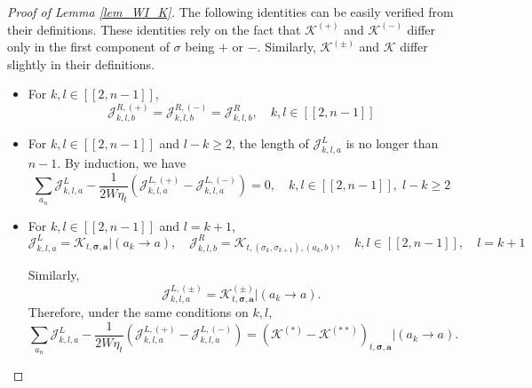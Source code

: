 \documentclass[10pt,a4paper]{amsart}
\newcommand{\cal}{\mathcal}
\begin{document}
\begin{proof}[Proof of Lemma \ref{lem_WI_K}]
The following  identities  can be easily verified from their definitions. These identities rely on the fact that ${\cal K}^{(+)}$ and ${\cal K}^{(-)}$ differ only in the first component of $\sigma$  being $+$ or  $-$. Similarly, ${\cal K}^{(\pm)}$ and ${\cal K}$ differ slightly in their definitions. 

\begin{itemize}
    \item  For $k,l\in[[2, n-1]]$,  
 \begin{equation}\label{kdjuwsz}
  {\cal J}^{R,(+)}_{k,l,b}=  {\cal J}^{R,(-)}_{k,l,b}={\cal J}^{R }_{k,l,b} ,\quad k,l\in[[2, n-1]]   
 \end{equation}

\item For $k,l\in[[2, n-1]]$ and $ l-k  \ge 2$, the length of  $ {\cal J}^{L }_{k,l,a} $ is no longer than  $ n-1$. By induction, we have 
\begin{equation}\label{a';slw}
    \sum_{a_n}{\cal J}^{L}_{k,l,a}-\frac{1}{2W\eta_t}\left({\cal J}^{L,(+)}_{k,l,a} -{\cal J}^{L,(-)}_{k,l,a} \right)=0 ,\quad  k,l\in[[2, n-1]], \;  l-k \ge 2
\end{equation}


\item For $k,l\in[[2, n-1]]$ and $l=k+1$,
 $$
{\cal J}^L_{k,l,a} ={\cal K}_{t, \boldsymbol{\sigma}, \textbf{a}}\Big|(a_k\to a)
 ,\quad  {\cal J}^R_{k,l,b}={\cal K}_{t, (\sigma_k, \sigma_{k+1}), (a_k, b)},\quad k,l\in[[2, n-1]],\quad l=k+1
$$
 
Similarly, 
$$
{\cal J}^{L,(\pm)}_{k,l,a} ={\cal K}^{(\pm)}_{t, \boldsymbol{\sigma}, \textbf{a}}\Big|(a_k\to a).
$$
Therefore, under the same conditions on $k, l$, 
\begin{equation}\label{uaiw03}
    \sum_{a_n}{\cal J}^{L}_{k,l,a}-\frac{1}{2W\eta_t}\left({\cal J}^{L,(+)}_{k,l,a} -{\cal J}^{L,(-)}_{k,l,a} \right)=
    \left({\cal K}^{(*)}-{\cal K}^{(**)}\right)_{t, \boldsymbol{\sigma}, \textbf{a}}\Bigg|(a_k\to a). %
\end{equation}

 
\end{itemize}


\end{proof}
\end{document}
